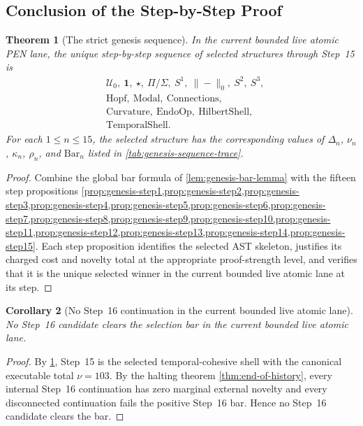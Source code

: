 \documentclass[11pt,a4paper]{article}
\theoremstyle{plain}
\newtheorem{theorem}{Theorem}[section]
\newtheorem{corollary}[theorem]{Corollary}
\theoremstyle{definition}
\theoremstyle{remark}
\newcommand{\U}{\mathcal{U}}
\begin{document}
\subsection{Conclusion of the Step-by-Step Proof}
\label{subsec:genesis-proof-conclusion}

\begin{theorem}[The strict genesis sequence]
\label{thm:strict-genesis-sequence}
In the current bounded live atomic PEN lane, the unique step-by-step sequence of
selected structures through Step~15 is
\[
  \begin{aligned}
    &\U_0,\ \mathbf{1},\ \star,\ \Pi/\Sigma,\ S^1,\ \|{-}\|_0,\ S^2,\ S^3,\\
    &\mathrm{Hopf},\ \mathrm{Modal},\ \mathrm{Connections},\\
    &\mathrm{Curvature},\ \mathrm{EndoOp},\ \mathrm{HilbertShell},\\
    &\mathrm{TemporalShell}.
  \end{aligned}
\]
For each $1\le n\le 15$, the selected structure has the corresponding values of
$\Delta_n$, $\nu_n$, $\kappa_n$, $\rho_n$, and $\mathrm{Bar}_n$ listed in
\cref{tab:genesis-sequence-trace}.
\end{theorem}

\begin{proof}
Combine the global bar formula of \cref{lem:genesis-bar-lemma} with the fifteen
step propositions
\cref{prop:genesis-step1,prop:genesis-step2,prop:genesis-step3,prop:genesis-step4,prop:genesis-step5,prop:genesis-step6,prop:genesis-step7,prop:genesis-step8,prop:genesis-step9,prop:genesis-step10,prop:genesis-step11,prop:genesis-step12,prop:genesis-step13,prop:genesis-step14,prop:genesis-step15}.
Each step proposition identifies the selected AST skeleton, justifies its charged
cost and novelty total at the appropriate proof-strength level, and verifies
that it is the unique selected winner in the current bounded live atomic lane at its step.
\end{proof}

\begin{corollary}[No Step~16 continuation in the current bounded live atomic lane]
\label{cor:genesis-no-step16}
No Step~16 candidate clears the selection bar in the current bounded live atomic
lane.
\end{corollary}

\begin{proof}
By \cref{thm:strict-genesis-sequence}, Step~15 is the selected temporal-cohesive
shell with the canonical executable total $\nu=103$.
By the halting theorem \cref{thm:end-of-history}, every internal Step~16
continuation has zero marginal external novelty and every disconnected
continuation fails the positive Step~16 bar.
Hence no Step~16 candidate clears the bar.
\end{proof}
\end{document}
